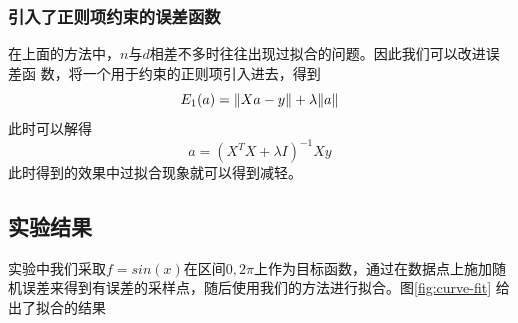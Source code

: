 \documentclass[10pt,a4paper]{article}
\theoremstyle{mythm}%
\numberwithin{equation}{section}
\DeclarePairedDelimiter\norm{\lVert}{\rVert}%
\begin{document}
\begin{CJK*}{UTF8}{wqyzh}
\subsubsection{引入了正则项约束的误差函数}

在上面的方法中，$n$与$d$相差不多时往往出现过拟合的问题。因此我们可以改进误差函
数，将一个用于约束的正则项引入进去，得到
\begin{equation}
    E_1(a) = \norm{Xa - y} + \lambda \norm{a}
\end{equation}
此时可以解得
\begin{equation}
    a = (X^T X + \lambda I)^{-1}Xy
\end{equation}
此时得到的效果中过拟合现象就可以得到减轻。

\subsection{实验结果}

实验中我们采取$f = sin(x)$在区间$0, 2\pi$上作为目标函数，通过在数据点上施加随
机误差来得到有误差的采样点，随后使用我们的方法进行拟合。图\ref{fig:curve-fit}
给出了拟合的结果


\end{CJK*}
\end{document}
